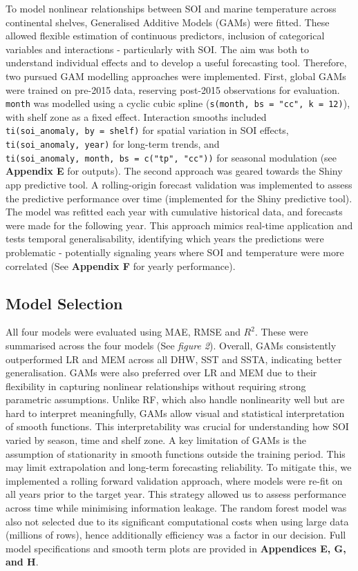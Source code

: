 \documentclass[letterpaper,9pt,twocolumn,twoside,]{pinp}
\begin{document}
To model nonlinear relationships between SOI and marine temperature
across continental shelves, Generalised Additive Models (GAMs) were
fitted. These allowed flexible estimation of continuous predictors,
inclusion of categorical variables and interactions - particularly with
SOI. The aim was both to understand individual effects and to develop a
useful forecasting tool. Therefore, two pursued GAM modelling approaches
were implemented. First, global GAMs were trained on pre-2015 data,
reserving post-2015 observations for evaluation. \texttt{month} was
modelled using a cyclic cubic spline
(\texttt{s(month,\ bs\ =\ "cc",\ k\ =\ 12)}), with shelf zone as a fixed
effect. Interaction smooths included
\texttt{ti(soi\_anomaly,\ by\ =\ shelf)} for spatial variation in SOI
effects, \texttt{ti(soi\_anomaly,\ year)} for long-term trends, and
\texttt{ti(soi\_anomaly,\ month,\ bs\ =\ c("tp",\ "cc"))} for seasonal
modulation (see \textbf{Appendix E} for outputs). The second approach
was geared towards the Shiny app predictive tool. A rolling-origin
forecast validation was implemented to assess the predictive performance
over time (implemented for the Shiny predictive tool). The model was
refitted each year with cumulative historical data, and forecasts were
made for the following year. This approach mimics real-time application
and tests temporal generalisability, identifying which years the
predictions were problematic - potentially signaling years where SOI and
temperature were more correlated (See \textbf{Appendix F} for yearly
performance).

\subsection{Model Selection}\label{model-selection}

All four models were evaluated using MAE, RMSE and \(R^2\). These were
summarised across the four models (See \emph{figure 2}). Overall, GAMs
consistently outperformed LR and MEM across all DHW, SST and SSTA,
indicating better generalisation. GAMs were also preferred over LR and
MEM due to their flexibility in capturing nonlinear relationships
without requiring strong parametric assumptions. Unlike RF, which also
handle nonlinearity well but are hard to interpret meaningfully, GAMs
allow visual and statistical interpretation of smooth functions. This
interpretability was crucial for understanding how SOI varied by season,
time and shelf zone. A key limitation of GAMs is the assumption of
stationarity in smooth functions outside the training period. This may
limit extrapolation and long-term forecasting reliability. To mitigate
this, we implemented a rolling forward validation approach, where models
were re-fit on all years prior to the target year. This strategy allowed
us to assess performance across time while minimising information
leakage. The random forest model was also not selected due to its
significant computational costs when using large data (millions of
rows), hence additionally efficiency was a factor in our decision. Full
model specifications and smooth term plots are provided in
\textbf{Appendices E, G, and H}.
\end{document}
